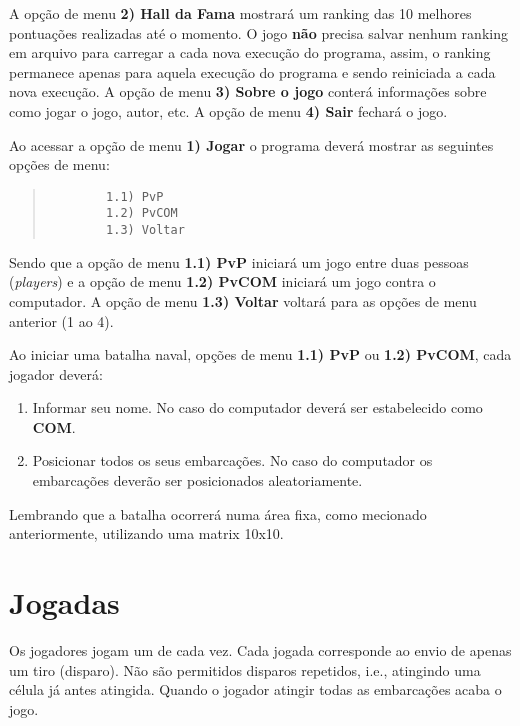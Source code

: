 \documentclass[defesa,oneside]{ppginf}
\begin{document}
A opção de menu \textbf{2) Hall da Fama} mostrará um ranking das 10 melhores pontuações realizadas até o momento. O jogo \textbf{não} precisa salvar nenhum ranking em arquivo para carregar a cada nova execução do programa, assim, o ranking permanece apenas para aquela execução do programa e sendo reiniciada a cada nova execução. A opção de menu \textbf{3) Sobre o jogo} conterá informações sobre como jogar o jogo, autor, etc. A opção de menu \textbf{4) Sair} fechará o jogo.

Ao acessar a opção de menu \textbf{1) Jogar} o programa deverá mostrar as seguintes opções de menu: 

\begin{quote}
	\begin{footnotesize}
		\begin{verbatim}
		1.1) PvP
		1.2) PvCOM
		1.3) Voltar
		\end{verbatim}		
	\end{footnotesize}
\end{quote}

Sendo que a opção de menu \textbf{1.1) PvP} iniciará um jogo entre duas pessoas (\emph{players}) e a opção de menu \textbf{1.2) PvCOM} iniciará um jogo contra o computador. A opção de menu \textbf{1.3) Voltar} voltará para as opções de menu anterior (1 ao 4).

Ao iniciar uma batalha naval, opções de menu \textbf{1.1) PvP} ou \textbf{1.2) PvCOM}, cada jogador deverá:

\begin{enumerate}
	\item Informar seu nome. No caso do computador deverá ser estabelecido como \textbf{COM}.
	\item Posicionar todos os seus embarcações. No caso do computador os embarcações deverão ser posicionados aleatoriamente.	
\end{enumerate}

Lembrando que a batalha ocorrerá numa área fixa, como mecionado anteriormente, utilizando uma matrix 10x10.

\section{Jogadas}

Os jogadores jogam um de cada vez. Cada jogada corresponde ao envio de apenas um tiro (disparo).  Não são permitidos disparos repetidos, i.e., atingindo uma célula já antes atingida. Quando o jogador atingir todas as embarcações acaba o jogo.
\end{document}
